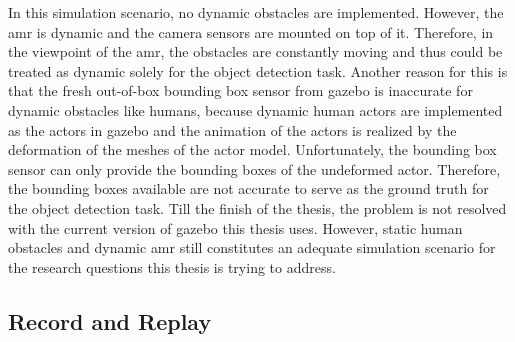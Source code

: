

In this simulation scenario, no dynamic obstacles are implemented. However, the \gls{amr} is dynamic and the camera sensors are mounted on top of it. Therefore, in the viewpoint of the \gls{amr}, the obstacles are constantly moving and thus could be treated as dynamic solely for the object detection task. Another reason for this is that the fresh out-of-box bounding box sensor from \gls{gazebo} is inaccurate for dynamic obstacles like humans, because dynamic human actors are implemented as the actors in \gls{gazebo} and the animation of the actors is realized by the deformation of the meshes of the actor model. Unfortunately, the bounding box sensor can only provide the bounding boxes of the undeformed actor. Therefore, the bounding boxes available are not accurate to serve as the ground truth for the object detection task. Till the finish of the thesis, the problem is not resolved with the current version of \gls{gazebo} this thesis uses. However, static human obstacles and dynamic \gls{amr} still constitutes an adequate simulation scenario for the research questions this thesis is trying to address. 

\subsection{Record and Replay}


